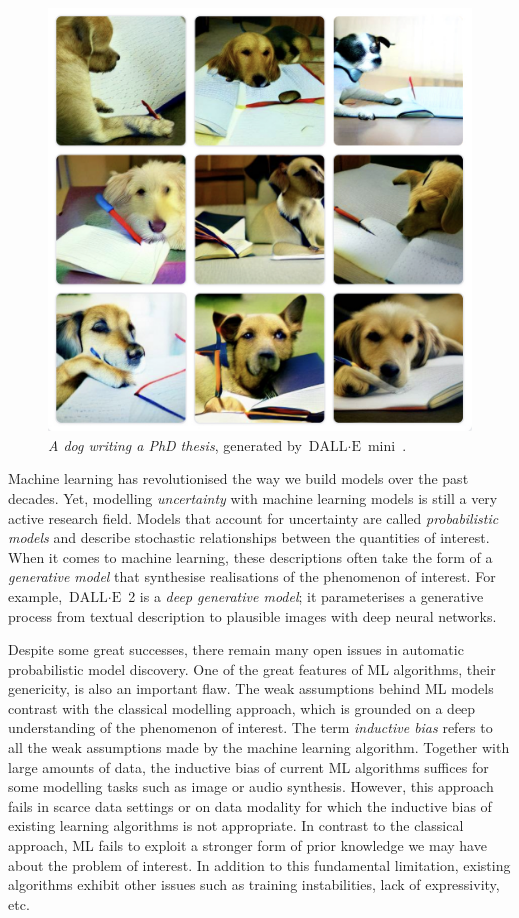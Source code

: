 \begin{figure}
  \centering
  \includegraphics[width=.7\textwidth]{figures/chapter01/dog_phd_thesis.jpeg}
  \caption{\textit{A dog writing a PhD thesis}, generated by $\text{DALL}\cdot\text{E}$ mini~\citep{Dayma_DALL_E_Mini_2021}.}
  \label{fig:dalle-mini}
\end{figure}

Machine learning has revolutionised the way we build models over the past decades. Yet, modelling \textit{uncertainty} with machine learning models is still a very active research field. Models that account for uncertainty are called \textit{probabilistic models} and describe stochastic relationships between the quantities of interest. When it comes to machine learning, these descriptions often take the form of a \textit{generative model} that synthesise realisations of the phenomenon of interest. For example, $\text{DALL}\cdot\text{E}$ 2 is a \textit{deep generative model}; it parameterises a generative process from textual description to plausible images with deep neural networks.

Despite some great successes, there remain many open issues in automatic probabilistic model discovery. One of the great features of ML algorithms, their genericity, is also an important flaw. The weak assumptions behind ML models contrast with the classical modelling approach, which is grounded on a deep understanding of the phenomenon of interest. The term \textit{inductive bias} refers to all the weak assumptions made by the machine learning algorithm. Together with large amounts of data, the inductive bias of current ML algorithms suffices for some modelling tasks such as image or audio synthesis. However, this approach fails in scarce data settings or on data modality for which the inductive bias of existing learning algorithms is not appropriate. In contrast to the classical approach, ML fails to exploit a stronger form of prior knowledge we may have about the problem of interest. In addition to this fundamental limitation, existing algorithms exhibit other issues such as training instabilities, lack of expressivity, etc.

